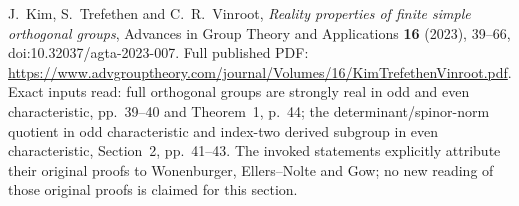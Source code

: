 J.~Kim, S.~Trefethen and C.~R.~Vinroot,
\emph{Reality properties of finite simple orthogonal groups},
Advances in Group Theory and Applications \textbf{16} (2023), 39--66,
doi:10.32037/agta-2023-007.
Full published PDF:
\url{https://www.advgrouptheory.com/journal/Volumes/16/KimTrefethenVinroot.pdf}.
Exact inputs read: full orthogonal groups are strongly real in odd
and even characteristic, pp.~39--40 and Theorem~1, p.~44;
the determinant/spinor-norm quotient in odd characteristic and
index-two derived subgroup in even characteristic, Section~2,
pp.~41--43.  The invoked statements explicitly attribute their
original proofs to Wonenburger, Ellers--Nolte and Gow; no new reading
of those original proofs is claimed for this section.
